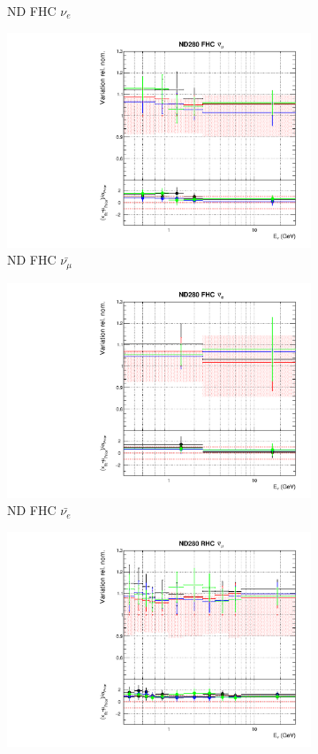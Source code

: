 \begin{figure}[t]
\begin{subfigure}{0.24\textwidth}
  \caption{ND FHC $\nu_e$}
  \label{fig:}
\end{subfigure}
\begin{subfigure}{0.24\textwidth}
  \centering
  \includegraphics[width=0.95\linewidth]{figs/detcovbinflux_2}
  \caption{ND FHC $\bar{\nu_{\mu}}$}
  \label{fig:}
\end{subfigure}
\begin{subfigure}{0.24\textwidth}
  \centering
  \includegraphics[width=0.95\linewidth]{figs/detcovbinflux_3}
  \caption{ND FHC $\bar{\nu_{e}}$}
  \label{fig:}
\end{subfigure}
\begin{subfigure}{0.24\textwidth}
  \centering
  \includegraphics[width=0.95\linewidth]{figs/detcovbinflux_4}

\end{subfigure}
\end{figure}
